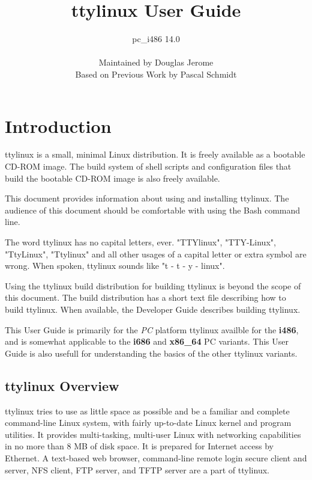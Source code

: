 \documentclass[10pt]{article}
\title{ttylinux User Guide}
\author{pc\_i486 14.0\\ \\Maintained by Douglas Jerome\\Based on Previous Work by Pascal Schmidt}
\begin{document}
\maketitle
\thispagestyle{empty}
\newpage


\tableofcontents


\newpage
{}
\parskip=10pt
\section{Introduction}

ttylinux is a small, minimal Linux distribution. It is freely available as a
bootable CD-ROM image. The build system of shell scripts and configuration
files that build the bootable CD-ROM image is also freely available.

This document provides information about using and installing ttylinux. The
audience of this document should be comfortable with using the Bash command
line.

The word ttylinux has no capital letters, ever. "TTYlinux", "TTY-Linux",
"TtyLinux", "Ttylinux" and all other usages of a capital letter or extra symbol
are wrong. When spoken, ttylinux sounds like "t - t - y - linux".

Using the ttylinux build distribution for building ttylinux is beyond the scope
of this document. The build distribution has a short text file describing how
to build ttylinux. When available, the Developer Guide describes building
ttylinux.

This User Guide is primarily for the {\it PC} platform ttylinux availble for
the {\bf i486}, and is somewhat applicable to the {\bf i686} and {\bf x86\_64}
PC variants. This User Guide is also usefull for understanding the basics of
the other ttylinux variants.

\subsection{ttylinux Overview}

ttylinux tries to use as little space as possible and be a familiar and
complete command-line Linux system, with fairly up-to-date Linux kernel and
program utilities. It provides multi-tasking, multi-user Linux with networking
capabilities in no more than 8 MB of disk space. It is prepared for Internet
access by Ethernet. A text-based web browser, command-line remote login secure
client and server, NFS client, FTP server, and TFTP server are a part of
ttylinux.
\end{document}
